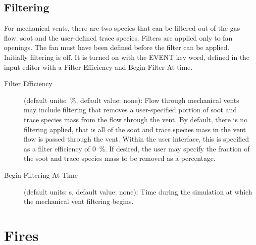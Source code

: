 \section{Filtering}

For mechanical vents, there are two species that can be filtered out of the gas flow: soot and the user-defined trace species. Filters are applied only to fan openings. The fan must have been defined before the filter can be applied. Initially filtering is off. It is turned on with the EVENT key word, defined in the input editor with a Filter Efficiency and Begin Filter At time.

\begin{description}
\item[Filter Efficiency] (default units:~\%, default value: none): Flow through mechanical vents may include filtering that removes a user-specified portion of soot and trace species mass from the flow through the vent.  By default, there is no filtering applied, that is all of the soot and trace species mass in the vent flow is passed through the vent. Within the user interface, this is specified as a filter efficiency of 0~\%.  If desired, the user may specify the fraction of the soot and trace species mass to be removed as a percentage.

\item[Begin Filtering At Time] (default units: s, default value: none): Time during the simulation at which the mechanical vent filtering begins.
\end{description}






\chapter{Fires}

